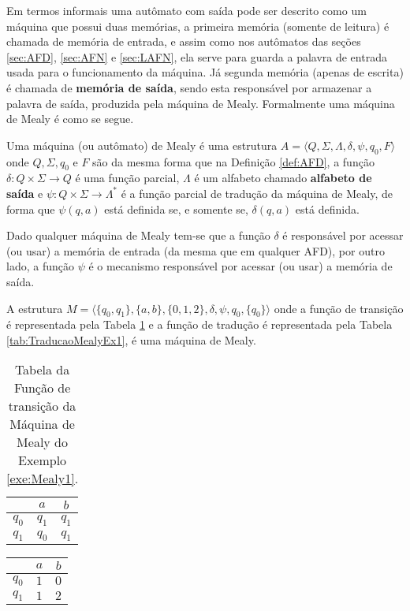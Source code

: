 Em termos informais uma autômato com saída pode ser descrito como um máquina que possui duas memórias, a primeira memória (somente de leitura) é chamada de memória de entrada, e assim como nos autômatos das seções \ref{sec:AFD}, \ref{sec:AFN} e \ref{sec:LAFN}, ela serve para guarda a palavra de entrada usada para o funcionamento da máquina. Já segunda memória (apenas de escrita) é chamada de \textbf{memória de saída}, sendo esta responsável por armazenar a palavra de saída, produzida pela máquina de Mealy. Formalmente uma máquina de Mealy é como se segue.

\begin{definition}\label{def:MealyMachine}
	Uma máquina (ou autômato) de Mealy é uma estrutura $A = \langle Q, \Sigma, \Lambda, \delta, \psi, q_0, F\rangle$ onde $Q, \Sigma, q_0$ e $F$ são da mesma forma que na Definição \ref{def:AFD}, a função $\delta: Q \times \Sigma \rightarrow Q$ é uma função parcial,  $\Lambda$ é um alfabeto chamado \textbf{alfabeto de saída} e $\psi: Q \times \Sigma \rightarrow \Lambda^*$ é a função parcial de tradução da máquina de Mealy, de forma que $\psi(q, a)$ está definida se, e somente se, $\delta(q, a)$ está definida.
\end{definition}

Dado qualquer máquina de Mealy tem-se que a função $\delta$ é responsável por acessar (ou usar) a memória de entrada (da mesma que em qualquer AFD), por outro lado, a função $\psi$ é o mecanismo responsável por acessar (ou usar) a memória de saída.

\begin{example}\label{exe:Mealy1}
	A estrutura $M = \langle \{q_0, q_1\}, \{a, b\}, \{0, 1, 2\}, \delta, \psi, q_0, \{q_0\} \rangle$ onde a função de transição é representada pela Tabela \ref{tab:TransicaoMealyEx1} e a função de tradução é representada pela Tabela \ref{tab:TraducaoMealyEx1}, é uma máquina de Mealy.
	
	\begin{table}[h]
		\centering
		\begin{tabular}{c|cc}
			\backslashbox{$Q$}{$\Sigma$} & $a$ & $b$\\ \hline
			$q_0$ & $q_1$ & $q_1$ \\
			$q_1$ & $q_0$ & $q_1$
		\end{tabular}
		\caption{Tabela da Função de transição da Máquina de Mealy do Exemplo \ref{exe:Mealy1}.}
		\label{tab:TransicaoMealyEx1}
	\end{table}
	
	\begin{table*}[h]
		\centering
		\begin{tabular}{c|cc}
			\backslashbox{$Q$}{$\Sigma$} & $a$ & $b$\\ \hline
			$q_0$ & $1$ & $0$ \\
			$q_1$ & $1$ & $2$ 
		\end{tabular}
		\caption{Tabela da Função de tradução da Máquina de Mealy do Exemplo \ref{exe:Mealy1}.}
		\label{tab:TraducaoMealyEx1}
	\end{table*}
\end{example}


